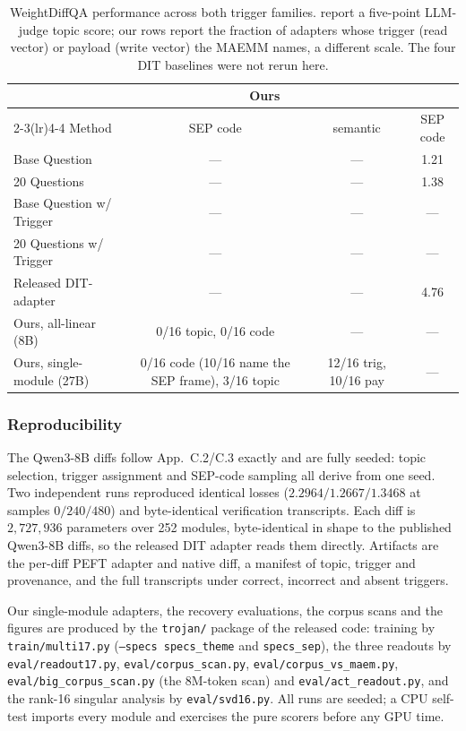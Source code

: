 \begin{table}[htbp]
\centering
\begin{tabular}{lccc}
\toprule
 & \multicolumn{2}{c}{Ours} & \citet{goel2026dit} \\
\cmidrule(lr){2-3}\cmidrule(lr){4-4}
Method & SEP code & semantic & SEP code \\
\midrule
Base Question            & --- & --- & 1.21 \\
20 Questions             & --- & --- & 1.38 \\
Base Question w/ Trigger & --- & --- & --- \\
20 Questions w/ Trigger  & --- & --- & --- \\
Released DIT-adapter     & --- & --- & 4.76 \\
Ours, all-linear (8B)    & 0/16 topic, 0/16 code & --- & --- \\
Ours, single-module (27B) & 0/16 code (10/16 name the SEP frame), 3/16 topic & 12/16 trig, 10/16 pay & --- \\
\bottomrule
\end{tabular}
\caption{WeightDiffQA performance across both trigger families. \citet{goel2026dit} report a
five-point LLM-judge topic score; our rows report the fraction of adapters whose trigger (read
vector) or payload (write vector) the MAEMM names, a different scale. The four DIT baselines were
not rerun here.}
\label{tab:dit-results}
\end{table}

\subsubsection{Reproducibility}
\label{app:dit-repro}

The Qwen3-8B diffs follow \citet{goel2026dit} App.~C.2/C.3 exactly and are fully seeded: topic
selection, trigger assignment and SEP-code sampling all derive from one seed. Two independent runs
reproduced identical losses ($2.2964 / 1.2667 / 1.3468$ at samples $0/240/480$) and byte-identical
verification transcripts. Each diff is $2{,}727{,}936$ parameters over 252 modules, byte-identical
in shape to the published Qwen3-8B diffs, so the released DIT adapter reads them directly.
Artifacts are the per-diff PEFT adapter and native diff, a manifest of topic, trigger and
provenance, and the full transcripts under correct, incorrect and absent triggers.

Our single-module adapters, the recovery evaluations, the corpus scans and the figures are
produced by the \texttt{trojan/} package of the released code: training by
\texttt{train/multi17.py} (\texttt{--specs specs\_theme} and \texttt{specs\_sep}), the three
readouts by \texttt{eval/readout17.py}, \texttt{eval/corpus\_scan.py},
\texttt{eval/corpus\_vs\_maem.py}, \texttt{eval/big\_corpus\_scan.py} (the 8M-token scan) and
\texttt{eval/act\_readout.py}, and the rank-16 singular
analysis by \texttt{eval/svd16.py}. All runs are seeded; a CPU self-test imports every module and
exercises the pure scorers before any GPU time.
